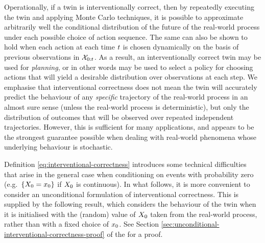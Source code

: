 Operationally, if a twin is interventionally correct, then by repeatedly executing the twin and applying Monte Carlo techniques, it is possible to approximate arbitrarily well the conditional distribution of the future of the real-world process under each possible choice of action sequence.
The same can also be shown to hold when each action at each time $t$ is chosen dynamically on the basis of previous observations in $\mathcal{X}_{0:t}$. %
As a result, an interventionally correct twin may be used for \emph{planning}, or in other words may be used to select a policy for choosing actions that will yield a desirable distribution over observations at each step.
We emphasise that interventional correctness does not mean the twin will accurately predict the behaviour of any \emph{specific} trajectory of the real-world process in an almost sure sense (unless the real-world process is deterministic), but only the distribution of outcomes that will be observed over repeated independent trajectories.
However, this is sufficient for many applications, and appears to be the strongest guarantee possible when dealing with real-world phenomena whose underlying behaviour is stochastic.

Definition \ref{eq:interventional-correctness} introduces some technical difficulties that arise in the general case when conditioning on events with probability zero (e.g.\ $\{X_0 = x_0\}$ if $X_0$ is continuous).
In what follows, it is more convenient to consider an unconditional formulation of interventional correctness.
This is supplied by the following result, which considers the behaviour of the twin when it is initialised with the (random) value of $X_0$ taken from the real-world process, rather than with a fixed choice of $x_0$.
See Section \ref{sec:unconditional-interventional-correctness-proof} of the \AppendixName for a proof.

